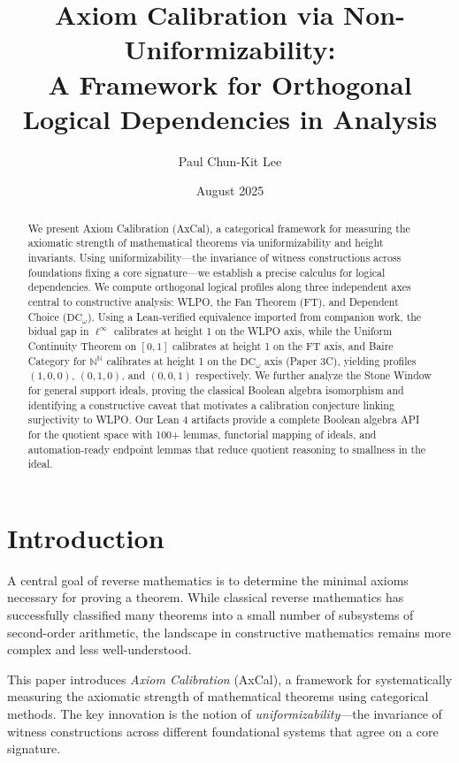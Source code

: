 \documentclass[11pt]{article}
\title{Axiom Calibration via Non-Uniformizability:\\
A Framework for Orthogonal Logical Dependencies in Analysis}
\author{Paul Chun-Kit Lee}
\date{August 2025}
\newcommand{\N}{\mathbb{N}}
\newcommand{\DCw}{\mathrm{DC}_\omega}
\newcommand{\linf}{\ell^\infty}
\begin{document}
\maketitle

\begin{abstract}
We present Axiom Calibration (AxCal), a categorical framework for measuring the axiomatic strength of mathematical theorems via uniformizability and height invariants. Using uniformizability—the invariance of witness constructions across foundations fixing a core signature—we establish a precise calculus for logical dependencies. We compute orthogonal logical profiles along three independent axes central to constructive analysis: WLPO, the Fan Theorem (FT), and Dependent Choice ($\DCw$). Using a Lean-verified equivalence imported from companion work, the bidual gap in $\linf$ calibrates at height 1 on the WLPO axis, while the Uniform Continuity Theorem on $[0,1]$ calibrates at height 1 on the FT axis, and Baire Category for $\N^\N$ calibrates at height 1 on the $\DCw$ axis (Paper 3C), yielding profiles $(1,0,0)$, $(0,1,0)$, and $(0,0,1)$ respectively. We further analyze the Stone Window for general support ideals, proving the classical Boolean algebra isomorphism and identifying a constructive caveat that motivates a calibration conjecture linking surjectivity to WLPO. Our Lean 4 artifacts provide a complete Boolean algebra API for the quotient space with 100+ lemmas, functorial mapping of ideals, and automation-ready endpoint lemmas that reduce quotient reasoning to smallness in the ideal.
\end{abstract}

\tableofcontents

\section{Introduction}

A central goal of reverse mathematics is to determine the minimal axioms necessary for proving a theorem. While classical reverse mathematics has successfully classified many theorems into a small number of subsystems of second-order arithmetic, the landscape in constructive mathematics remains more complex and less well-understood.

This paper introduces \emph{Axiom Calibration} (AxCal), a framework for systematically measuring the axiomatic strength of mathematical theorems using categorical methods. The key innovation is the notion of \emph{uniformizability}—the invariance of witness constructions across different foundational systems that agree on a core signature.
\end{document}
